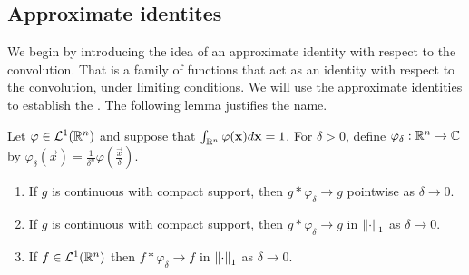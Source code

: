 \subsection{Approximate identites}

We begin by introducing the idea of an approximate identity with respect to the convolution. That is a family of functions that act as an identity with respect to the convolution, under limiting conditions. We will use the approximate identities to establish the . The following lemma justifies the name.

\begin{lemma}
\label{lemma:fourier:approxident}
Let $\varphi \in {\mathcal {L}^1}({\mathbb R}^n)$ and suppose that $\int_{{\mathbb R}^n} \varphi(\mathbf{x}) d\mathbf{x} = 1$. For $\delta > 0$, define $\varphi_\delta : {\mathbb R}^n \to \mathbb{C}$ by $\varphi_\delta (\vec{x}) = \frac{1}{\delta^n} \varphi(\frac{\vec{x}}{\delta})$. 
\begin{enumerate}[noitemsep]
\item If $g$ is continuous with compact support, then $g \ast \varphi_\delta \to g$ pointwise as $\delta \to 0$.
\item If $g$ is continuous with compact support, then $g \ast \varphi_\delta \to g$ in $\left\lVert\cdot\right\rVert_1$ as $\delta \to 0$.
\item If $f \in {\mathcal {L}^1}({\mathbb R}^n)$ then $f \ast \varphi_\delta \to f$ in  $\left\lVert\cdot\right\rVert_1$ as $\delta \to 0$.
\end{enumerate}
\end{lemma}
